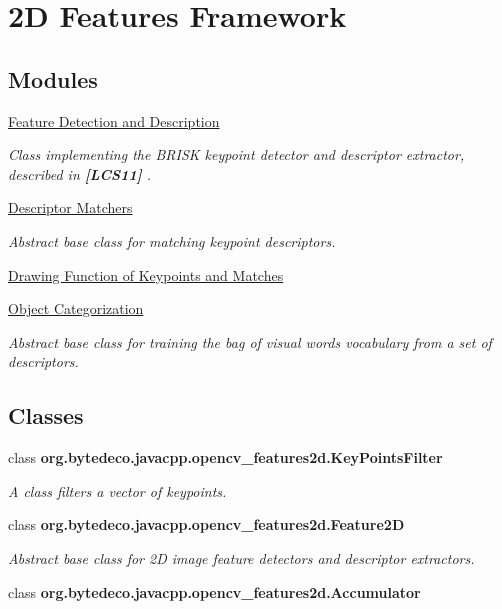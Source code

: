\hypertarget{group__features2d}{}\section{2D Features Framework}
\label{group__features2d}
\subsection*{Modules}
\begin{DoxyCompactItemize}
\item 
\hyperlink{group__features2d__main}{Feature Detection and Description}
\begin{DoxyCompactList}\small\item\em Class implementing the B\+R\+I\+SK keypoint detector and descriptor extractor, described in {\bfseries [L\+C\+S11]} . \end{DoxyCompactList}\item 
\hyperlink{group__features2d__match}{Descriptor Matchers}
\begin{DoxyCompactList}\small\item\em Abstract base class for matching keypoint descriptors. \end{DoxyCompactList}\item 
\hyperlink{group__features2d__draw}{Drawing Function of Keypoints and Matches}
\item 
\hyperlink{group__features2d__category}{Object Categorization}
\begin{DoxyCompactList}\small\item\em Abstract base class for training the {\itshape bag of visual words} vocabulary from a set of descriptors. \end{DoxyCompactList}\end{DoxyCompactItemize}
\subsection*{Classes}
\begin{DoxyCompactItemize}
\item 
class {\bfseries org.\+bytedeco.\+javacpp.\+opencv\+\_\+features2d.\+Key\+Points\+Filter}
\begin{DoxyCompactList}\small\item\em A class filters a vector of keypoints. \end{DoxyCompactList}\item 
class {\bfseries org.\+bytedeco.\+javacpp.\+opencv\+\_\+features2d.\+Feature2D}
\begin{DoxyCompactList}\small\item\em Abstract base class for 2D image feature detectors and descriptor extractors. \end{DoxyCompactList}\item 
class {\bfseries org.\+bytedeco.\+javacpp.\+opencv\+\_\+features2d.\+Accumulator}
\end{DoxyCompactItemize}
